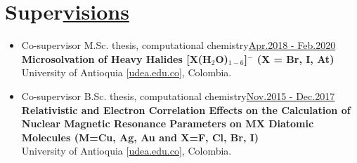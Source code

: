 \section{Super\href{.}{visions}}

\begin{itemize}
    \small

    \item Co-supervisor M.Sc. thesis, computational chemistry\hfill \href{.}{Apr.2018 - Feb.2020}\\
          \textbf{Microsolvation of Heavy Halides [X(H$_2$O)$_{1-6}$]$^-$ (X = Br, I, At)}\\
          University of Antioquia [\href{www.udea.edu.co}{udea.edu.co}],
          Colombia.


    \item Co-supervisor B.Sc. thesis, computational chemistry\hfill \href{.}{Nov.2015 - Dec.2017}\\
          \textbf{Relativistic and Electron Correlation Effects on the Calculation of Nuclear Magnetic Resonance Parameters on MX Diatomic Molecules (M=Cu, Ag, Au and X=F, Cl, Br, I)}\\
          University of Antioquia [\href{www.udea.edu.co}{udea.edu.co}],
          Colombia.

\end{itemize}


